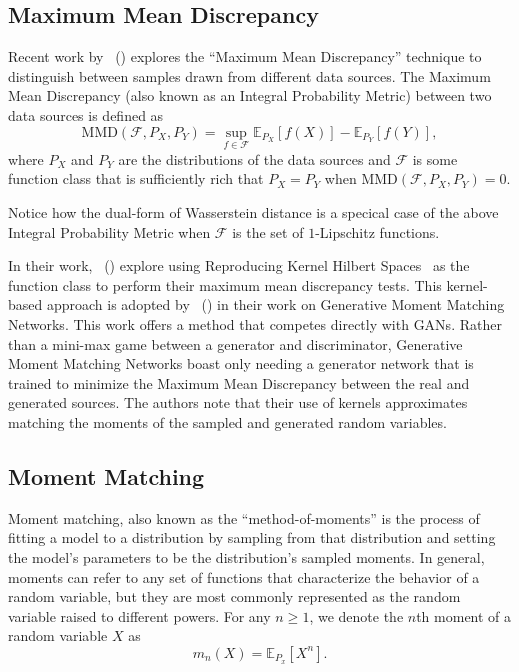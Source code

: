 \documentclass[letterpaper]{article} %
\newcommand{\namecite}[1]{\citeauthor{#1}~(\citeyear{#1})}
\begin{document}
\subsection{Maximum Mean Discrepancy}

Recent work by \namecite{Gretton2012AKT} explores the ``Maximum Mean Discrepancy'' technique to distinguish between samples drawn from different data sources. The Maximum Mean Discrepancy (also known as an Integral Probability Metric) between two data sources is defined as
\begin{equation}
\text{MMD}(\mathcal{F}, P_X, P_Y) = \sup_{f \in \mathcal{F}} \mathbb{E}_{P_X}\left[f(X)\right] - \mathbb{E}_{P_Y}\left[f(Y)\right],
\end{equation}
where $P_X$ and $P_Y$ are the distributions of the data sources and $\mathcal{F}$ is some function class that is sufficiently rich that $P_X = P_Y$ when $\text{MMD}(\mathcal{F}, P_X, P_Y) = 0$.

Notice how the dual-form of Wasserstein distance is a specical case of the above Integral Probability Metric when $\mathcal{F}$ is the set of $1$-Lipschitz functions.

In their work, \namecite{Gretton2012AKT} explore using Reproducing Kernel Hilbert Spaces~\cite{berlinet2011reproducing} as the function class to perform their maximum mean discrepancy tests. This kernel-based approach is adopted by \namecite{Li2015GenerativeMM} in their work on Generative Moment Matching Networks. This work offers a method that competes directly with GANs. Rather than a mini-max game between a generator and discriminator, Generative Moment Matching Networks boast only needing a generator network that is trained to minimize the Maximum Mean Discrepancy between the real and generated sources. The authors note that their use of kernels approximates matching the moments of the sampled and generated random variables.

\subsection{Moment Matching}

Moment matching, also known as the ``method-of-moments'' is the process of fitting a model to a distribution by sampling from that distribution and setting the model's parameters to be the distribution's sampled moments. In general, moments can refer to any set of functions that characterize the behavior of a random variable, but they are most commonly represented as the random variable raised to different powers. For any $n \geq 1$, we denote the $n$th moment of a random variable $X$ as
\begin{equation}
m_n(X) = \mathbb{E}_{P_x} \left[ X^n\right].
\end{equation}
\end{document}
